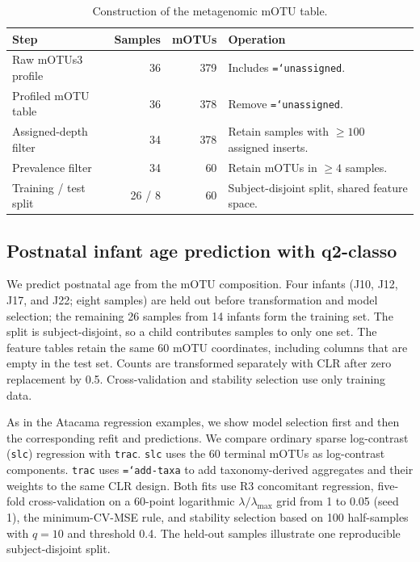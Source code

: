 \documentclass[11pt,a4paper]{article}
\newcommand{\code}[1]{\allowbreak\texttt{\hyphenchar\font=`\-\relax #1}}
\newcommand{\pkg}[1]{\textbf{#1}}
\begin{document}
\begin{table}[htbp]
\centering
\small
\caption{Construction of the metagenomic mOTU table.}
\label{tab:motus-filtering}
\begin{tabular}{@{}lrrl@{}}
\toprule
\textbf{Step} & \textbf{Samples} & \textbf{mOTUs} & \textbf{Operation} \\
\midrule
Raw mOTUs3 profile & 36 & 379 & Includes \code{unassigned}. \\
Profiled mOTU table & 36 & 378 & Remove \code{unassigned}. \\
Assigned-depth filter & 34 & 378 & Retain samples with $\geq100$ assigned inserts. \\
Prevalence filter & 34 & 60 & Retain mOTUs in $\geq4$ samples. \\
Training / test split & 26 / 8 & 60 & Subject-disjoint split, shared feature space. \\
\bottomrule
\end{tabular}
\end{table}

\subsection{Postnatal infant age prediction with \pkg{q2-classo}}
\label{sec:metagenomics-regression}

We predict postnatal age from the mOTU composition. Four infants (J10, J12,
J17, and J22; eight samples) are held out before transformation and model
selection; the remaining 26 samples from 14 infants form the training set. The
split is subject-disjoint, so a child contributes samples to only one set. The
feature tables retain the same 60 mOTU coordinates, including columns that are
empty in the test set. Counts are transformed separately with CLR after zero
replacement by 0.5. Cross-validation and stability selection use only training
data.

As in the Atacama regression examples, we show model selection first and then
the corresponding refit and predictions. We compare ordinary sparse
log-contrast (\texttt{slc}) regression with \texttt{trac}. \texttt{slc} uses the 60 terminal
mOTUs as log-contrast components. \texttt{trac} uses \code{add-taxa} to add
taxonomy-derived aggregates and their weights to the same CLR design. Both
fits use R3 concomitant regression, five-fold cross-validation on a 60-point
logarithmic $\lambda/\lambda_{\max}$ grid from 1 to 0.05 (seed 1), the
minimum-CV-MSE rule, and stability selection based on 100 half-samples with
$q=10$ and threshold 0.4. The held-out samples illustrate one reproducible
subject-disjoint split.
\end{document}
